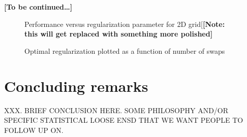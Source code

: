 \documentclass[12pt]{article}
\theoremstyle{plain}
\begin{document}
\textbf{[To be continued\ldots]}

\begin{figure}
    \centering
    \caption{Performance versus regularization parameter for 2D
      grid[\textbf{[Note: this will get replaced with something more polished]}}
\end{figure}

\begin{figure}
    \centering
    \caption{Optimal regularization plotted as a function of number of swaps}
\end{figure}

\section{Concluding remarks}
\label{sxn:conc}

XXX.  BRIEF CONCLUSION HERE.  SOME PHILOSOPHY AND/OR SPECIFIC STATISTICAL LOOSE ENSD THAT WE WANT PEOPLE TO FOLLOW UP ON.




%

\end{document}

